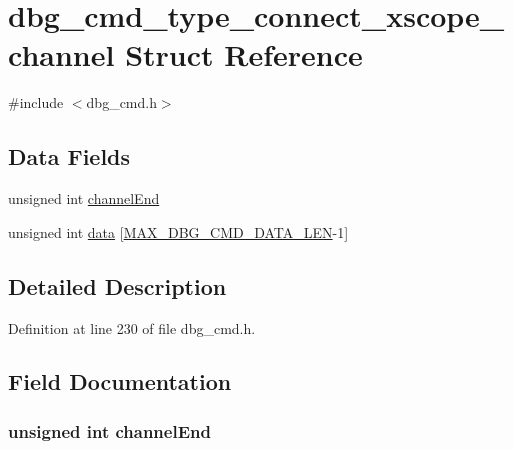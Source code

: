 \hypertarget{structdbg__cmd__type__connect__xscope__channel}{\section{dbg\-\_\-cmd\-\_\-type\-\_\-connect\-\_\-xscope\-\_\-channel Struct Reference}
\label{structdbg__cmd__type__connect__xscope__channel}
}


{\ttfamily \#include $<$dbg\-\_\-cmd.\-h$>$}

\subsection*{Data Fields}
\begin{DoxyCompactItemize}
\item 
unsigned int \hyperlink{structdbg__cmd__type__connect__xscope__channel_adb8779baf4a10ba8f92de8832641dff0}{channel\-End}
\item 
unsigned int \hyperlink{structdbg__cmd__type__connect__xscope__channel_abceed6826af53b88f4cc936fac1716f0}{data} \mbox{[}\hyperlink{dbg__cmd_8h_a4552ec15033c8a68870cdf80eda5470c}{M\-A\-X\-\_\-\-D\-B\-G\-\_\-\-C\-M\-D\-\_\-\-D\-A\-T\-A\-\_\-\-L\-E\-N}-\/1\mbox{]}
\end{DoxyCompactItemize}


\subsection{Detailed Description}


Definition at line 230 of file dbg\-\_\-cmd.\-h.



\subsection{Field Documentation}
\hypertarget{structdbg__cmd__type__connect__xscope__channel_adb8779baf4a10ba8f92de8832641dff0}{
\subsubsection[{channel\-End}]{\setlength{\rightskip}{0pt plus 5cm}unsigned int channel\-End}}\label{structdbg__cmd__type__connect__xscope__channel_adb8779baf4a10ba8f92de8832641dff0}



